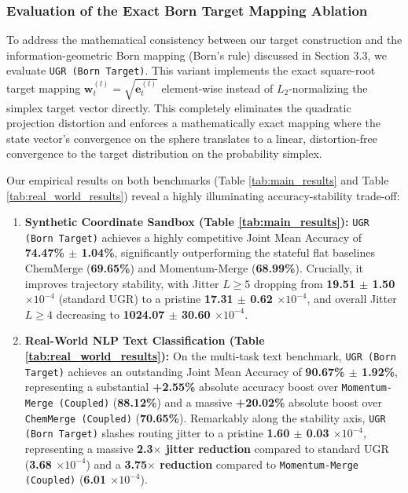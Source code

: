 \subsubsection{Evaluation of the Exact Born Target Mapping Ablation}
To address the mathematical consistency between our target construction and the information-geometric Born mapping (Born's rule) discussed in Section 3.3, we evaluate \texttt{UGR (Born Target)}. This variant implements the exact square-root target mapping $\mathbf{w}_t^{(l)} = \sqrt{\mathbf{e}_t^{(l)}}$ element-wise instead of $L_2$-normalizing the simplex target vector directly. This completely eliminates the quadratic projection distortion and enforces a mathematically exact mapping where the state vector's convergence on the sphere translates to a linear, distortion-free convergence to the target distribution on the probability simplex.

Our empirical results on both benchmarks (Table \ref{tab:main_results} and Table \ref{tab:real_world_results}) reveal a highly illuminating accuracy-stability trade-off:
\begin{enumerate}
    \item \textbf{Synthetic Coordinate Sandbox (Table \ref{tab:main_results}):} \texttt{UGR (Born Target)} achieves a highly competitive Joint Mean Accuracy of \textbf{74.47\% $\pm$ 1.04\%}, significantly outperforming the stateful flat baselines ChemMerge (\textbf{69.65\%}) and Momentum-Merge (\textbf{68.99\%}). Crucially, it improves trajectory stability, with Jitter $L \ge 5$ dropping from \textbf{19.51 $\pm$ 1.50 $\times 10^{-4}$} (standard UGR) to a pristine \textbf{17.31 $\pm$ 0.62 $\times 10^{-4}$}, and overall Jitter $L \ge 4$ decreasing to \textbf{1024.07 $\pm$ 30.60 $\times 10^{-4}$}.
    \item \textbf{Real-World NLP Text Classification (Table \ref{tab:real_world_results}):} On the multi-task text benchmark, \texttt{UGR (Born Target)} achieves an outstanding Joint Mean Accuracy of \textbf{90.67\% $\pm$ 1.92\%}, representing a substantial \textbf{+2.55\%} absolute accuracy boost over \texttt{Momentum-Merge (Coupled)} (\textbf{88.12\%}) and a massive \textbf{+20.02\%} absolute boost over \texttt{ChemMerge (Coupled)} (\textbf{70.65\%}). Remarkably along the stability axis, \texttt{UGR (Born Target)} slashes routing jitter to a pristine \textbf{1.60 $\pm$ 0.03 $\times 10^{-4}$}, representing a massive \textbf{2.3$\times$ jitter reduction} compared to standard UGR (\textbf{3.68 $\times 10^{-4}$}) and a \textbf{3.75$\times$ reduction} compared to \texttt{Momentum-Merge (Coupled)} (\textbf{6.01 $\times 10^{-4}$}).
\end{enumerate}

